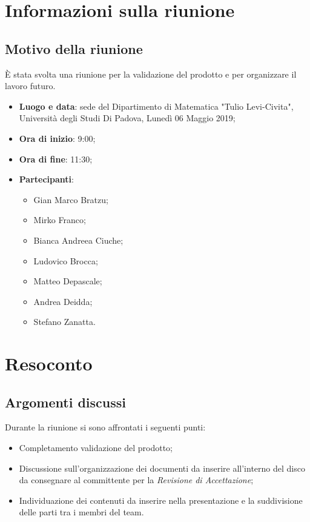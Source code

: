 \documentclass[a4paper,12pt]{article}
\begin{document}
	\tableofcontents
	\cleardoublepage
	\section{Informazioni sulla riunione}
	\subsection{Motivo della riunione} \`{E} stata svolta una riunione per la validazione del prodotto e per organizzare il lavoro futuro.
	\begin{itemize}
		\item \textbf{Luogo e data}: sede del Dipartimento di Matematica "Tulio Levi-Civita", Università degli Studi Di Padova, Lunedì 06 Maggio 2019;
		\item \textbf{Ora di inizio}: 9:00;
		\item \textbf{Ora di fine}: 11:30;
		\item \textbf{Partecipanti}:  
		\begin{itemize}
			\item Gian Marco Bratzu;
			\item Mirko Franco;
			\item Bianca Andreea Ciuche;
			\item Ludovico Brocca;
			\item Matteo Depascale;
			\item Andrea Deidda;
			\item Stefano Zanatta.
		\end{itemize}
	\end{itemize}
	
	
		\section{Resoconto}
	\subsection{Argomenti discussi}
	Durante la riunione si sono affrontati i seguenti punti:
	\begin{itemize}		
		\item Completamento validazione del prodotto;
		\item Discussione sull'organizzazione dei documenti da inserire all'interno del disco da consegnare al committente per la \textit{Revisione di Accettazione};
      	\item Individuazione dei contenuti da inserire nella presentazione e la suddivisione delle parti tra i membri del team.
	\end{itemize}
	
\end{document}
